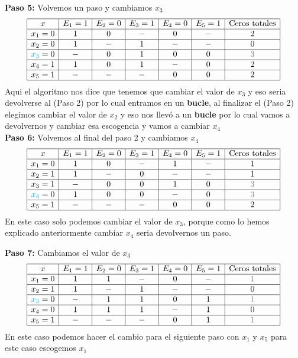 \begin{sol}
\textbf{Paso 5:} Volvemos un paso y cambiamos $x_3$
$$
\begin{array}{|c|c|c|c|c|c|c|c|}
\hline
x & E_1=1 & E_2=0 & E_3=1 & E_4=0 & E_5=1 & \text{Ceros totales}\\
\hline
x_1= 0& 1 & 0& - & 0& - &2\\
\hline
x_2=0& 1&-& 1&- &-&0\\
\hline
\textcolor{cyan}{x_3}=0&-&0&1&0&0&\textcolor{gray}{3}\\
\hline
x_4=1& 1&0&1&-&0&2\\
\hline
x_5=1&-&-&-&0&0&2\\
\hline
\end{array}
$$
Aqui el algoritmo nos dice que tenemos que cambiar el valor de $x_3$ y eso seria devolverse al (Paso 2) por lo cual entramos en un \textbf{bucle}, al finalizar el (Paso 2) elegimos cambiar el valor de $x_2$ y eso nos llevó a un \textbf{bucle} por lo cual vamos a devolvernos y cambiar esa escogencia y vamos a cambiar $x_4$\\
\textbf{Paso 6:} Volvemos al final del paso 2 y cambiamos $x_4$
$$
\begin{array}{|c|c|c|c|c|c|c|c|}
\hline
x & E_1=1 & E_2=0 & E_3=1 & E_4=0 & E_5=1 & \text{Ceros totales}\\
\hline
x_1= 0& 1 & 0& - & 1& - &1\\
\hline
x_2=1& 1&-& 0&- &-&1\\
\hline
x_3=1&-&0&0&1&0&\textcolor{gray}{3}\\
\hline
\textcolor{cyan}{x_4}=0& 1&0&0&-&0&\textcolor{gray}{3}\\
\hline
x_5=1&-&-&-&0&0&2\\
\hline
\end{array}
$$
En este caso solo podemos cambiar el valor de $x_3$, porque como lo hemos explicado anteriormente cambiar $x_4$ seria devolvernos un paso.

\textbf{Paso 7:} Cambiamos el valor de $x_3$
$$
\begin{array}{|c|c|c|c|c|c|c|c|}
\hline
x & E_1=1 & E_2=0 & E_3=1 & E_4=0 & E_5=1 & \text{Ceros totales}\\
\hline
x_1= 0& 1 & 1& - & 0& - &\textcolor{gray}{1}\\
\hline
x_2=1& 1&-& 1&- &-&0\\
\hline
\textcolor{cyan}{x_3}=0&-&1&1&0&1&\textcolor{gray}{1}\\
\hline
x_4=0& 1&1&1&-&1&0\\
\hline
x_5=1&-&-&-&0&1&\textcolor{gray}{1}\\
\hline
\end{array}
$$
En este caso podemos hacer el cambio para el siguiente paso con $x_1$ y $x_5$ para este caso escogemos $x_1$


\end{sol}

